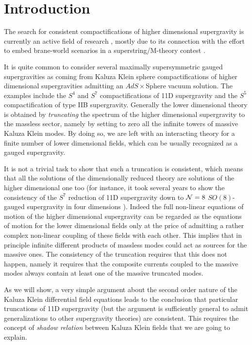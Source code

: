\documentclass[a4paper,11pt]{article}
\begin{document}
\section{Introduction}
The search for consistent compactifications of higher dimensional
supergravity is currently an active field of research \cite{CLP},
mostly due to its connection with the effort to embed brane-world
scenarios in a superstring/M-theory contest \cite{DLS}.
\par
It is quite common to consider several maximally supersymmetric
gauged supergravities as coming from Kaluza Klein sphere
compactifications of higher dimensional supergravities admitting
an $AdS\times$Sphere vacuum solution. The examples include the
$S^4$ and $S^7$ compactifications of 11D supergravity and the
$S^5$ compactification of type IIB supergravity. Generally the
lower dimensional theory is obtained by \emph{truncating} the
spectrum of the higher dimensional supergravity to the massless
sector, namely by setting to zero all the infinite towers of
massive Kaluza Klein modes. By doing so, we are left with an
interacting theory for a finite number of lower dimensional
fields, which can be usually recognized as a gauged supergravity.
\par
It is not a trivial task to show that such a truncation is
consistent, which means that all the solutions of the
dimensionally reduced theory are solutions of the higher
dimensional one too (for instance, it took several years to show
the consistency of the $S^7$ reduction of 11D supergravity down to
${\cal N}=8$ $SO(8)$-gauged supergravity in four dimensions
\cite{dewittnicolai1, dewittnicolai2}). Indeed the full non-linear
equations of motion of the higher dimensional supergravity can be
regarded as the equations of motion for the lower dimensional
fields only at the price of admitting a rather complex non-linear
coupling of these fields with each other. This implies that in
principle infinite different products of massless modes could act
as sources for the massive ones. The consistency of the truncation
requires that this does not happen, namely it requires that the
composite currents coupled to the massive modes always contain at
least one of the massive truncated modes.
\par
As we will show, a very simple argument about the second order
nature of the Kaluza Klein differential field equations leads to
the conclusion that particular truncations of 11D supergravity
(but the argument is sufficiently general to admit generalizations
to other supergravity theories) are consistent. This requires the
concept of \emph{shadow relation} between Kaluza Klein fields that
we are going to explain.
%
%
\end{document}
